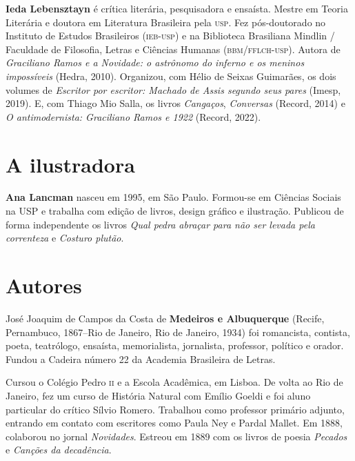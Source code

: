 \textbf{Ieda Lebensztayn} é crítica literária, pesquisadora e ensaísta. Mestre em Teoria Literária e doutora em Literatura Brasileira pela \textsc{usp}. Fez pós-doutorado no Instituto de Estudos Brasileiros (\textsc{ieb-usp}) e na Biblioteca Brasiliana Mindlin / Faculdade de Filosofia, Letras e Ciências Humanas (\textsc{bbm/fflch-usp}). Autora de \emph{Graciliano Ramos e a Novidade: o astrônomo do inferno e os meninos impossíveis} (Hedra, 2010). Organizou, com Hélio de Seixas Guimarães, os dois volumes de \emph{Escritor por escritor: Machado de Assis segundo seus pares} (Imesp, 2019). E, com Thiago Mio Salla, os livros \emph{Cangaços}, \emph{Conversas} (Record, 2014) e \emph{O antimodernista: Graciliano Ramos e 1922} (Record, 2022).

\section{A ilustradora}

\textbf{Ana Lancman} nasceu em 1995, em São Paulo. Formou-se em Ciências Sociais na USP e trabalha com edição de livros, design gráfico e ilustração. Publicou de forma independente os livros \emph{Qual pedra abraçar para não ser levada pela correnteza} e \emph{Costuro plutão}.

\section{Autores}

José Joaquim de Campos da Costa de \textbf{Medeiros e Albuquerque}
(Recife, Pernambuco, 1867--Rio de Janeiro, Rio de Janeiro, 1934) foi
romancista, contista, poeta, teatrólogo, ensaísta, memorialista,
jornalista, professor, político e orador. Fundou a Cadeira número 22 da
Academia Brasileira de Letras.

Cursou o Colégio Pedro \textsc{ii} e a Escola Acadêmica, em Lisboa. De volta ao
Rio de Janeiro, fez um curso de História Natural com Emílio Goeldi e foi
aluno particular do crítico Sílvio Romero. Trabalhou como professor
primário adjunto, entrando em contato com escritores como Paula Ney e
Pardal Mallet. Em 1888, colaborou no jornal \emph{Novidades}. Estreou em
1889 com os livros de poesia \emph{Pecados} e \emph{Canções da
decadência}.

